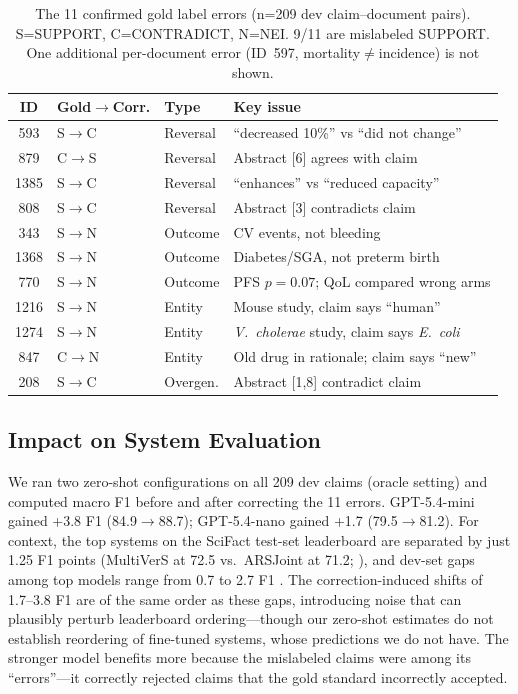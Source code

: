 \documentclass[11pt]{article}
\begin{document}
\begin{table}[t]
\centering
\footnotesize
\begin{tabular}{@{}cllp{2.7cm}@{}}
\toprule
\textbf{ID} & \textbf{Gold$\to$Corr.} & \textbf{Type} & \textbf{Key issue} \\
\midrule
593 & S$\to$C & Reversal & ``decreased 10\%'' vs ``did not change'' \\
879 & C$\to$S & Reversal & Abstract [6] agrees with claim \\
1385 & S$\to$C & Reversal & ``enhances'' vs ``reduced capacity'' \\
808 & S$\to$C & Reversal & Abstract [3] contradicts claim \\
343 & S$\to$N & Outcome & CV events, not bleeding \\
1368 & S$\to$N & Outcome & Diabetes/SGA, not preterm birth \\
770 & S$\to$N & Outcome & PFS $p{=}0.07$; QoL compared wrong arms \\
1216 & S$\to$N & Entity & Mouse study, claim says ``human'' \\
1274 & S$\to$N & Entity & \textit{V.\ cholerae} study, claim says \textit{E.\ coli} \\
847 & C$\to$N & Entity & Old drug in rationale; claim says ``new'' \\
208 & S$\to$C & Overgen. & Abstract [1,8] contradict claim \\
\bottomrule
\end{tabular}
\caption{The 11 confirmed gold label errors (n=209 dev claim--document pairs). S=SUPPORT, C=CONTRADICT, N=NEI. 9/11 are mislabeled SUPPORT. One additional per-document error (ID~597, mortality$\neq$incidence) is not shown.}
\label{tab:errors}
\end{table}

\subsection{Impact on System Evaluation}
\label{sec:impact}

We ran two zero-shot configurations on all 209 dev claims (oracle setting) and computed macro F1 before and after correcting the 11 errors.
GPT-5.4-mini gained +3.8 F1 (84.9$\to$88.7); GPT-5.4-nano gained +1.7 (79.5$\to$81.2).
For context, the top systems on the SciFact test-set leaderboard are separated by just 1.25 F1 points (MultiVerS at 72.5 vs.\ ARSJoint at 71.2; \citealp{wadden2022multivers,zhang2021abstract}), and dev-set gaps among top models range from 0.7 to 2.7 F1 \citep{kosprdic2024scientific}.
The correction-induced shifts of 1.7--3.8 F1 are of the same order as these gaps, introducing noise that can plausibly perturb leaderboard ordering---though our zero-shot estimates do not establish reordering of fine-tuned systems, whose predictions we do not have.
The stronger model benefits more because the mislabeled claims were among its ``errors''---it correctly rejected claims that the gold standard incorrectly accepted.
\end{document}

